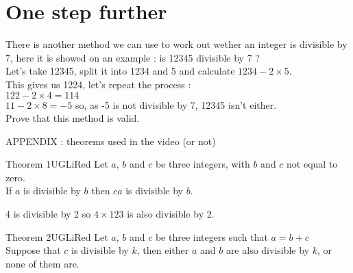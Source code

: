 \documentclass[12pt,a4paper,eval,english,firamath]{nsi}
\begin{document}
\section*{One step further}
There is another method we can use to work out wether an integer is divisible by 7, here it is showed on an example : is 12345 divisible by 7 ?\\

Let's take 12345, split it into 1234 and 5 and calculate $1234 - 2\times 5$.\\
This gives us 1224, let's repeat the process : \\
$122 - 2\times 4 = 114$\\
$11 - 2\times 8 = -5$ so, as -5 is not divisible by 7, 12345 isn't either.\\

Prove that this method is valid.\\


\newpage
{\LARGE\color{UGLiBlue}\titlefont APPENDIX : theorems used in the video (or not)}\\



\begin{encadrecolore}{Theorem 1}{UGLiRed}
    Let $a$, $b$ and $c$ be three integers, with $b$ and $c$ not equal to zero.\\

    If $a$ is divisible by $b$ then $ca$ is divisible by $b$.
\end{encadrecolore}


\begin{exemple}[]
    4 is divisible by 2 so $4\times 123$ is also divisible by 2.
\end{exemple}

\begin{encadrecolore}{Theorem 2}{UGLiRed}
    Let $a$, $b$ and $c$ be three integers such that $a = b + c$\\
    Suppose that $c$ is divisible by $k$, then either $a$ and $b$ are also divisible by $k$, or none of them are.
\end{encadrecolore}
\end{document}
